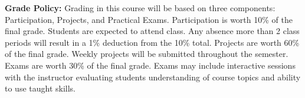 \vspace*{.25in}
\noindent\textbf{Grade Policy:} 
Grading in this course will be based on three components: Participation, Projects, and Practical Exams.
Participation is worth 10\% of the final grade. Students are expected to attend class. Any absence more than 2 class periods will result in a 1\% deduction from the 10\% total.
Projects are worth 60\% of the final grade. Weekly projects will be submitted throughout the semester.
Exams are worth 30\% of the final grade. Exams may include interactive sessions with the instructor evaluating students understanding of course topics and ability to use taught skills.